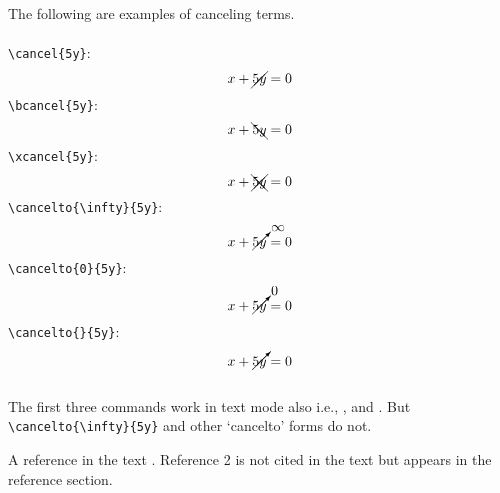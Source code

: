 \documentclass[11pt, oneside]{article}   	%
\begin{document}
\clearpage

\noindent The following are examples of canceling terms. \\ \\
\verb|\cancel{5y}|:
\[ x+\cancel{5y}=0\]
\verb|\bcancel{5y}|:
\[ x+\bcancel{5y}=0\]
\verb|\xcancel{5y}|:
\[ x+\xcancel{5y}=0\]
\verb|\cancelto{\infty}{5y}|:
\[ x+\cancelto{\infty}{5y}=0\]
\verb|\cancelto{0}{5y}|:
\[ x+\cancelto{0}{5y}=0\]
\verb|\cancelto{}{5y}|:
\[ x+\cancelto{}{5y}=0\] \\

\noindent The first three commands work in text mode also i.e., ,  and 
.  But \verb|\cancelto{\infty}{5y}| and other `cancelto' forms do not. 


\clearpage
A reference in the text \cite{NCRP151}.  Reference 2 is not cited in the text but appears in the reference section.

\nocite{NCRP49}


\end{document}
